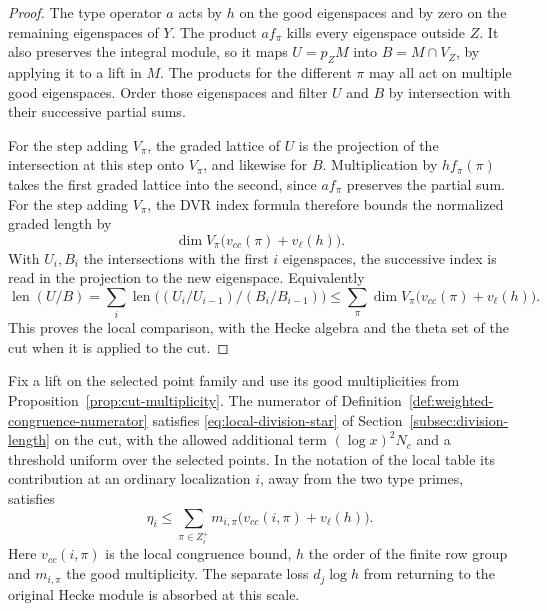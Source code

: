 \begin{proof}
The type operator \(a\) acts by \(h\) on the good
eigenspaces and by zero on the remaining eigenspaces
of \(Y\). The product \(af_\pi\) kills every eigenspace
outside \(Z\). It also preserves the integral module,
so it maps \(U=p_ZM\) into \(B=M\cap V_Z\), by applying
it to a lift in \(M\). The products for the different
\(\pi\) may all act on multiple good eigenspaces.
Order those eigenspaces and filter \(U\) and \(B\) by
intersection with their successive partial sums.

For
the step adding \(V_\pi\), the graded lattice of \(U\)
is the projection of the intersection at this step
onto \(V_\pi\), and likewise for \(B\). Multiplication
by \(h f_\pi(\pi)\) takes the first graded lattice into
the second, since \(af_\pi\) preserves the partial sum.
For the step adding \(V_\pi\), the DVR index formula therefore bounds the normalized graded length by
\[
 \dim V_\pi\bigl(v_{cc}(\pi)+v_\ell(h)\bigr).
\]
With \(U_i,B_i\) the intersections with the first \(i\) eigenspaces,
the successive index is read in the projection to the new eigenspace.
Equivalently
\[
 \operatorname{len}(U/B)=
 \sum_i\operatorname{len}\bigl((U_i/U_{i-1})/(B_i/B_{i-1})\bigr)
 \le\sum_{\pi}\dim V_\pi\bigl(v_{cc}(\pi)+v_\ell(h)\bigr).
\]
This proves the local comparison, with the Hecke
algebra and the theta set of the cut when it is
applied to the cut.
\end{proof}

\begin{proposition}\label{prop:weighted-local-return}
Fix a lift on the selected point family and use its good
multiplicities from Proposition~\ref{prop:cut-multiplicity}.
The numerator of Definition~\ref{def:weighted-congruence-numerator} satisfies \eqref{eq:local-division-star} of Section~\ref{subsec:division-length} on the cut, with the allowed additional term \((\log x)^2N_c\) and a threshold uniform over the selected points. In the notation of the local table its contribution at an ordinary localization \(i\), away from the two type primes, satisfies
\[
 \eta_i\le \sum_{\pi\in Z_i^+}m_{i,\pi}
               \bigl(v_{cc}(i,\pi)+v_\ell(h)\bigr).
\]
Here \(v_{cc}(i,\pi)\) is the local congruence bound, \(h\) the order of the finite row group and \(m_{i,\pi}\) the good multiplicity. The separate loss \(d_j\log h\) from returning to the original Hecke module is absorbed at this scale.
\end{proposition}

